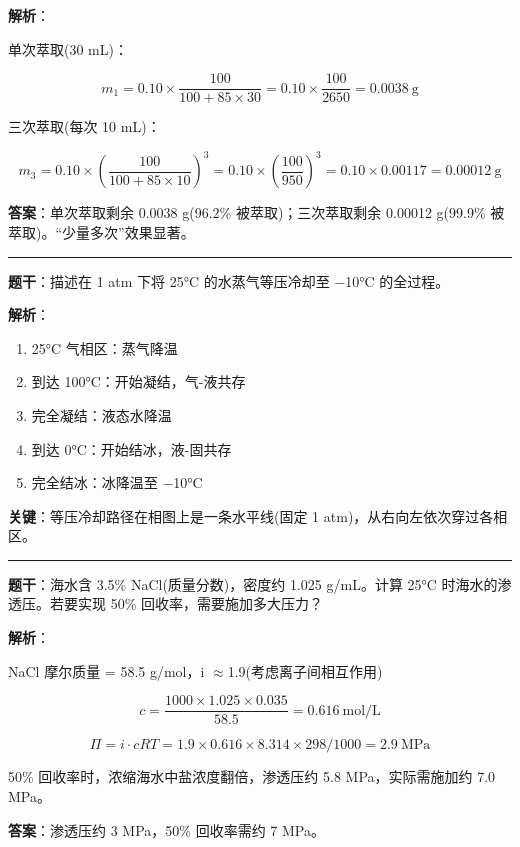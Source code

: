 \documentclass[a4paper,11pt]{ctexart}
\providecommand{\tightlist}{\setlength{\itemsep}{0pt}\setlength{\parskip}{0pt}}
\newcommand{\箭}{\ensuremath{\rightarrow}}
\newcommand{\左箭}{\ensuremath{\leftarrow}}
\newcommand{\上箭}{\ensuremath{\uparrow}}
\newcommand{\下箭}{\ensuremath{\downarrow}}
\newcommand{\衡}{\ensuremath{\rightleftharpoons}}
\newcommand{\双箭}{\ensuremath{\leftrightarrow}}
\newcommand{\约等于}{\ensuremath{\approx}}
\newcommand{\小于等于}{\ensuremath{\leq}}
\newcommand{\大于等于}{\ensuremath{\geq}}
\newcommand{\不等于}{\ensuremath{\neq}}
\newcommand{\西格马}{\ensuremath{\sigma}}
\newcommand{\派}{\ensuremath{\pi}}
\begin{document}
\textbf{解析}：

单次萃取(30 mL)：

\[m_1 = 0.10 \times \frac{100}{100 + 85 \times 30} = 0.10 \times \frac{100}{2650} = 0.0038\ \mathrm{g}\]

三次萃取(每次 10 mL)：

\[m_3 = 0.10 \times \left(\frac{100}{100 + 85 \times 10}\right)^3 = 0.10 \times \left(\frac{100}{950}\right)^3 = 0.10 \times 0.00117 = 0.00012\ \mathrm{g}\]

\textbf{答案}：单次萃取剩余 0.0038 g(96.2\% 被萃取)；三次萃取剩余 0.00012 g(99.9\% 被萃取)。``少量多次''效果显著。

\begin{center}\rule{0.5\linewidth}{0.5pt}\end{center}

\textbf{题干}：描述在 1 atm 下将 25°C 的水蒸气等压冷却至 −10°C 的全过程。

\textbf{解析}：

\begin{enumerate}
\def\labelenumi{\arabic{enumi}.}
\tightlist
\item
  25°C 气相区：蒸气降温
\item
  到达 100°C：开始凝结，气-液共存
\item
  完全凝结：液态水降温
\item
  到达 0°C：开始结冰，液-固共存
\item
  完全结冰：冰降温至 −10°C
\end{enumerate}

\textbf{关键}：等压冷却路径在相图上是一条水平线(固定 1 atm)，从右向左依次穿过各相区。

\begin{center}\rule{0.5\linewidth}{0.5pt}\end{center}

\textbf{题干}：海水含 3.5\% NaCl(质量分数)，密度约 1.025 g/mL。计算 25°C 时海水的渗透压。若要实现 50\% 回收率，需要施加多大压力？

\textbf{解析}：

NaCl 摩尔质量 = 58.5 g/mol，i \约等于 1.9(考虑离子间相互作用)

\[c = \frac{1000 \times 1.025 \times 0.035}{58.5} = 0.616\ \mathrm{mol/L}\]

\[\Pi = i \cdot cRT = 1.9 \times 0.616 \times 8.314 \times 298 / 1000 = 2.9\ \mathrm{MPa}\]

50\% 回收率时，浓缩海水中盐浓度翻倍，渗透压约 5.8 MPa，实际需施加约 7.0 MPa。

\textbf{答案}：渗透压约 3 MPa，50\% 回收率需约 7 MPa。
\end{document}
